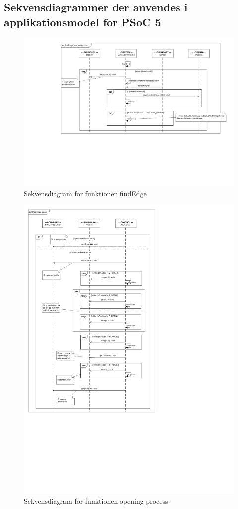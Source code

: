 \subsection{Sekvensdiagrammer der anvendes i applikationsmodel for PSoC 5}
\begin{figure}[H]
	\caption{Sekvensdiagram for funktionen findEdge}
	\label{SD:PSoC:findEdge}
	\includegraphics[scale=0.5,trim=100 0 0 0]{findEdge}
\end{figure}

\begin{figure}[H]
	\caption{Sekvensdiagram for funktionen opening process}
	\label{SD:PSoC:openingprocess}
	\includegraphics[scale=0.7,trim=0 0 0 0, clip]{Opening_process}
\end{figure}

